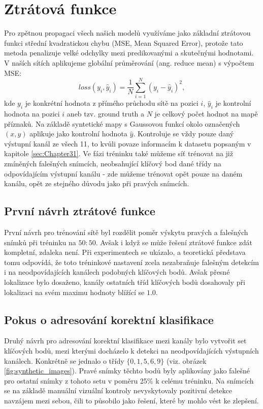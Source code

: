 \section{Ztrátová funkce}
\label{sec:Chapter47}
Pro zpětnou propagaci všech našich modelů využíváme jako základní ztrátovou funkci střední kvadratickou chybu (MSE, Mean Squared Error), protože tato metoda penalizuje velké odchylky mezi predikovanými a skutečnými hodnotami.  V naších sítích aplikujeme globální průměrování (ang. reduce mean) s výpočtem MSE:
\begin{equation}
    loss(y_i, \hat{y}_i) = \frac{1}{N} \sum_{i=1}^{N} (y_i - \hat{y}_i)^2,
\end{equation}
kde $y_i$ je konkrétní hodnota z přímého průchodu sítě na pozici $i$, $\hat{y}_i$ je kontrolní hodnota na pozici $i$ aneb tzv. ground truth a $N$ je celkový počet hodnot na mapě příznaků. Na základě syntetické mapy s Gaussovou funkcí okolo označených $(x, y)$ aplikuje jako kontrolní hodnota $\hat{y}$. Kontroluje se vždy pouze daný výstupní kanál ze všech 11, to kvůli povaze informacím k datasetu popsaným v kapitole \ref{sec:Chapter31}. Ve fázi tréninku také můžeme síť trénovat na již zmíněných falešných snímcích, neobsahující klíčový bod dané třídy na odpovídajícím výstupní kanálu - zde můžeme trénovat opět pouze na daném kanálu, opět ze stejného důvodu jako při pravých snímcích.

\subsection{První návrh ztrátové funkce}

První návrh pro trénování sítě byl rozdělit poměr výskytu pravých a falešných snímků při tréninku na $50:50$. Avšak i když se může řešení ztrátové funkce zdát kompletní, zdaleka není. Při experimentech se ukázalo, a teoretická představa tomu odpovídá, že toto tréninkové nastavení zcela nezabraňuje falešným detekcím i na neodpovídajících kanálech podobných klíčových bodů. Avšak přesné lokalizace bylo dosaženo, kanály ostatních tříd klíčových bodů dosahovaly při lokalizaci na svém maximu hodnoty blížící se $1.0$.

\subsection{Pokus o adresování korektní klasifikace}

Druhý návrh pro adresování korektní klasifikace mezi kanály bylo vytvořit set klíčových bodů, mezi kterými docházelo k detekci na neodpovídajících výstupních kanálech. Konkrétně se jednalo o třídy $\{0, 1, 5, 6, 9\}$ (viz. obrázek \ref{fig:synthetic_images}). Pravé snímky těchto bodů byly aplikovány jako falešné pro ostatní snímky z tohoto setu v poměru 25\% k celému tréninku. Na snímcích se na základě manuální vizuální kontroly nevyskytovaly pozitivní detekce navzájem mezi sebou, čili to působilo jako řešení, které by mohlo vést ke zlepšení.

